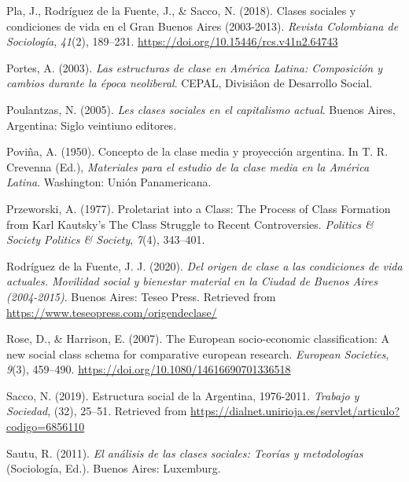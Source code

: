 \documentclass[
]{article}
\newlength{\cslhangindent}
\newlength{\cslentryspacingunit} %
\newenvironment{CSLReferences}[2] %
 {%
  \setlength{\parindent}{0pt}
  \ifodd #1
  \let\oldpar\par
  \def\par{\hangindent=\cslhangindent\oldpar}
  \fi
  \setlength{\parskip}{#2\cslentryspacingunit}
 }%
 {}
\begin{document}
\begin{CSLReferences}{1}{0}
\leavevmode{}%
Pla, J., Rodríguez de la Fuente, J., \& Sacco, N. (2018). Clases sociales y condiciones de vida en el {Gran} {Buenos} {Aires} (2003-2013). \emph{Revista Colombiana de Sociología}, \emph{41}(2), 189--231. \url{https://doi.org/10.15446/rcs.v41n2.64743}

\leavevmode{}%
Portes, A. (2003). \emph{Las estructuras de clase en {América} {Latina}: Composición y cambios durante la época neoliberal}. CEPAL, Divisiâon de Desarrollo Social.

\leavevmode{}%
Poulantzas, N. (2005). \emph{Les clases sociales en el capitalismo actual}. Buenos Aires, Argentina: Siglo veintiuno editores.

\leavevmode{}%
Poviña, A. (1950). Concepto de la clase media y proyección argentina. In T. R. Crevenna (Ed.), \emph{Materiales para el estudio de la clase media en la {América} {Latina}}. Washington: Unión Panamericana.

\leavevmode{}%
Przeworski, A. (1977). Proletariat into a {Class}: {The} {Process} of {Class} {Formation} from {Karl} {Kautsky}'s {The} {Class} {Struggle} to {Recent} {Controversies}. \emph{Politics \& Society Politics \& Society}, \emph{7}(4), 343--401.

\leavevmode{}%
Rodríguez de la Fuente, J. J. (2020). \emph{Del origen de clase a las condiciones de vida actuales. {Movilidad} social y bienestar material en la {Ciudad} de {Buenos} {Aires} (2004-2015)}. Buenos Aires: Teseo Press. Retrieved from \url{https://www.teseopress.com/origendeclase/}

\leavevmode{}%
Rose, D., \& Harrison, E. (2007). The {European} socio-economic classification: A new social class schema for comparative european research. \emph{European Societies}, \emph{9}(3), 459--490. \url{https://doi.org/10.1080/14616690701336518}

\leavevmode{}%
Sacco, N. (2019). Estructura social de la {Argentina}, 1976-2011. \emph{Trabajo y Sociedad}, (32), 25--51. Retrieved from \url{https://dialnet.unirioja.es/servlet/articulo?codigo=6856110}

\leavevmode{}%
Sautu, R. (2011). \emph{El análisis de las clases sociales: Teorías y metodologías} (Sociología, Ed.). Buenos Aires: Luxemburg.


\end{CSLReferences}
\end{document}
